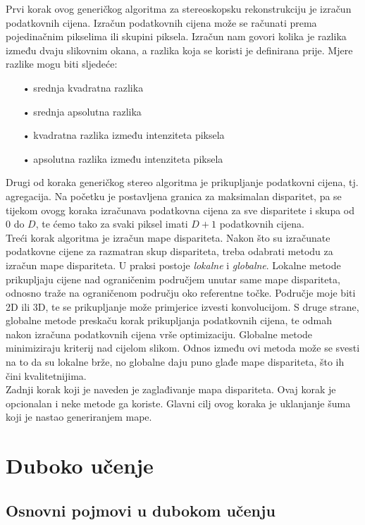 \documentclass[times, utf8, zavrsni]{fer}
\begin{document}
Prvi korak ovog generičkog algoritma za stereoskopsku rekonstrukciju je izračun podatkovnih cijena. Izračun podatkovnih cijena može se računati prema pojedinačnim pikselima ili skupini piksela.  Izračun nam govori kolika je razlika između dvaju slikovnim okana, a razlika koja se koristi je definirana prije. Mjere razlike mogu biti sljedeće:
\begin{itemize}
\item[•] srednja kvadratna razlika
\item[•] srednja apsolutna razlika
\item[•] kvadratna razlika između intenziteta piksela
\item[•] apsolutna razlika između intenziteta piksela
\end{itemize}

\newpage
Drugi od koraka generičkog stereo algoritma je prikupljanje podatkovni cijena, tj. agregacija.  Na početku je postavljena granica za maksimalan disparitet, pa se tijekom ovogg koraka izračunava podatkovna cijena za sve disparitete i skupa  od $0$ do $D$, te ćemo tako za svaki piksel imati $D+1$ podatkovnih cijena.\\
Treći korak algoritma je izračun mape dispariteta. Nakon što su izračunate podatkovne cijene za razmatran skup dispariteta, treba odabrati metodu za izračun mape dispariteta. U praksi postoje \textit{lokalne} i \textit{globalne}. Lokalne metode prikupljaju cijene nad ograničenim područjem unutar same mape dispariteta, odnosno traže na ograničenom području oko referentne točke. Područje moje biti 2D ili 3D, te se prikupljanje može primjerice izvesti konvolucijom. S druge strane, globalne metode  preskaču korak prikupljanja podatkovnih cijena, te odmah nakon izračuna podatkovnih cijena vrše optimizaciju. Globalne metode minimiziraju kriterij nad cijelom slikom. Odnos između ovi metoda može se svesti na to da su lokalne brže, no globalne daju puno glađe mape dispariteta, što ih čini kvalitetnijima.\\
Zadnji korak koji je naveden je zaglađivanje mapa dispariteta. Ovaj korak je opcionalan i neke metode ga koriste. Glavni cilj ovog koraka je uklanjanje šuma koji je nastao generiranjem mape. 
\chapter{Duboko učenje}
\section{Osnovni pojmovi u dubokom učenju}
\end{document}
